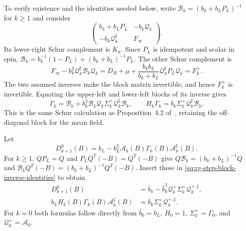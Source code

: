 \documentclass[11pt,letterpaper,reqno]{amsart}
\newcommand{\extref}[2]{#1 of~\cite{#2}}
\begin{document}
To verify existence and the identities needed below,
write $\mathcal B_k=(b_k+b_LP_L)^{-1}$ for $k\ge1$
and consider
\[
 \begin{pmatrix}
 b_k+b_LP_L&-b_k\mathcal Q_k\\
 -b_k\mathcal Q_k^\sharp&F_\infty
 \end{pmatrix}.
\]
Its lower-right Schur complement is $K_k$.
Since $P_L$ is idempotent and scalar in spin,
$\mathcal B_k=b_k^{-1}(1-P_L)+(b_k+b_L)^{-1}P_L$.
The other Schur complement is
\[
 F_\infty-b_k^2\mathcal Q_k^\sharp\mathcal B_k\mathcal Q_k
    =D_B+\mu+\frac{b_kb_L}{b_k+b_L}
                                  \mathcal Q_k^\sharp P_L\mathcal Q_k
    =F_k^+.
\]
The two assumed inverses make the block matrix
invertible, and hence $F_k^+$ is invertible.
Equating the upper-left and lower-left blocks of
its inverse gives
\begin{equation}\label{eq:rg-step-block-inverse-identities}
 \Gamma_k=\mathcal B_k+
       b_k^2\mathcal B_k\mathcal Q_k\Sigma_k^+
                                     \mathcal Q_k^\sharp\mathcal B_k,
 \qquad
 H_k\Gamma_k=b_k\Sigma_k^+\mathcal Q_k^\sharp\mathcal B_k.
\end{equation}
This is the same Schur calculation as
Proposition~\extref{4.2}{FermionBlockManuscript}, retaining
the off-diagonal block for the mean field.

Let
\begin{equation}\label{eq:rg-step-unscaled-coarse}
 D_{k+1}^0(B)=b_L-
                       b_L^2\mathcal A_k(B)\Gamma_k(B)\mathcal A_k^\sharp(B).
\end{equation}
For $k\ge1$, $QP_L=Q$ and $P_LQ^T(-B)=Q^T(-B)$
give
$Q\mathcal B_k=(b_k+b_L)^{-1}Q$ and
$\mathcal B_kQ^T(-B)=(b_k+b_L)^{-1}Q^T(-B)$.
Insert these in \eqref{eq:rg-step-block-inverse-identities}
to obtain
\begin{equation}\label{eq:rg-step-compressed-identities}
 \begin{split}
 D_{k+1}^0(B)
       &=\bar b_k-\bar b_k^2
                            \mathcal Q_k^+\Sigma_k^+\mathcal Q_k^{+,\sharp},\\
 b_LH_k(B)\Gamma_k(B)\mathcal A_k^\sharp(B)
       &=\bar b_k\Sigma_k^+\mathcal Q_k^{+,\sharp}.
 \end{split}
\end{equation}
For $k=0$ both formulas follow directly from
$\bar b_0=b_L$, $H_0=1$,
$\Sigma_0^+=\Gamma_0$, and
$\mathcal Q_0^+=\mathcal A_0$.
\end{document}
